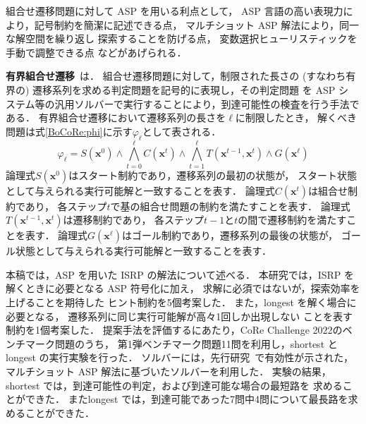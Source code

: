 組合せ遷移問題に対して ASP を用いる利点として，
ASP 言語の高い表現力により，記号制約を簡潔に記述できる点，
マルチショット ASP 解法により，同一な解空間を繰り返し
探索することを防げる点，
変数選択ヒューリスティックを手動で調整できる点
などがあげられる．

\textbf{有界組合せ遷移}~\cite{Yamada21:jssst}は．
組合せ遷移問題に対して，制限された長さの (すなわち有
界の) 遷移系列を求める判定問題を記号的に表現し，その判定問題 を ASP シ
ステム等の汎用ソルバーで実行することにより，到達可能性の検査を行う手法である．
有界組合せ遷移において遷移系列の長さを$\ell$に制限したとき，
解くべき問題は式\eqref{BoCoRe:phi}に示す$\varphi_{\ell}$として表される．
%
\begin{equation}
  \varphi_{\ell} = S(\bm{x}^0)
  \land \bigwedge_{t=0}^{\ell} C(\bm{x}^t) 
  \land \bigwedge_{t=1}^{\ell} T(\bm{x}^{t-1},\bm{x}^{t})
  \land G(\bm{x}^\ell) \label{BoCoRe:phi}
\end{equation}
%
論理式$S(\bm{x}^0)$はスタート制約であり，遷移系列の最初の状態が，
スタート状態として与えられる実行可能解と一致することを表す．
論理式$C(\bm{x}^t)$は組合せ制約であり，
各ステップ$t$で基の組合せ問題の制約を満たすことを表す．
論理式$T(\bm{x}^{t-1},\bm{x}^{t})$は遷移制約であり，
各ステップ$t-1$と$t$の間で遷移制約を満たすことを表す．
論理式$G(\bm{x}^\ell)$はゴール制約であり，遷移系列の最後の状態が，
ゴール状態として与えられる実行可能解と一致することを表す．

本稿では，ASP を用いた ISRP の解法について述べる．
本研究では，ISRP を解くときに必要となる ASP 符号化に加え，
求解に必須ではないが，探索効率を上げることを期待した
ヒント制約を5個考案した．
また，longest を解く場合に必要となる，
遷移系列に同じ実行可能解が高々1回しか出現しない
ことを表す制約を1個考案した．
提案手法を評価するにあたり，CoRe Challenge 2022のベンチマーク問題のうち，
第1弾ベンチマーク問題11問を利用し，shortest と longest の実行実験を行った．
ソルバーには，先行研究~\cite{Yamada21:jssst}で有効性が示された，
マルチショット ASP 解法に基づいたソルバーを利用した．
実験の結果，shortest では，到達可能性の判定，および到達可能な場合の最短路を
求めることができた．
またlongest では，到達可能であった7問中4問について最長路を求めることができた．